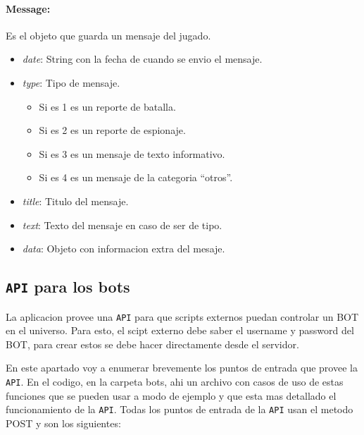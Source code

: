 \documentclass{article}
\begin{document}
\paragraph{Message:} Es el objeto que guarda un mensaje del jugado.
\vspace{-5mm}
\begin{itemize}[noitemsep]
    \item \textit{date}: String con la fecha de cuando se envio el mensaje.
    \item \textit{type}: Tipo de mensaje.
    \begin{itemize}[noitemsep]
        \item Si es 1 es un reporte de batalla.
        \item Si es 2 es un reporte de espionaje.
        \item Si es 3 es un mensaje de texto informativo.
        \item Si es 4 es un mensaje de la categoria ``otros''.
    \end{itemize}
    \item \textit{title}: Titulo del mensaje.
    \item \textit{text}: Texto del mensaje en caso de ser de tipo.
    \item \textit{data}: Objeto con informacion extra del mesaje.
\end{itemize}

\hypertarget{API-Section}{\subsection{\texttt{API} para los bots}}

La aplicacion provee una \texttt{API} para que scripts externos puedan controlar un BOT en el universo. Para esto, el scipt externo debe saber el username y password del BOT, para crear estos se debe hacer directamente desde el servidor.

En este apartado voy a enumerar brevemente los puntos de entrada que provee la \texttt{API}. En el codigo, en la carpeta bots, ahi un archivo con casos de uso de estas funciones que se pueden usar a modo de ejemplo y que esta mas detallado el funcionamiento de la \texttt{API}. Todas los puntos de entrada de la \texttt{API} usan el metodo POST y son los siguientes:
\end{document}
